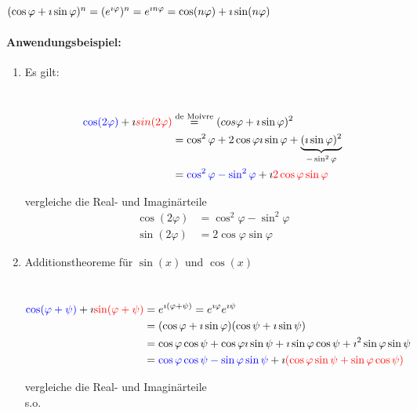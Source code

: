 \Beweis\quad\\
$(\cos\varphi+\imath \sin\varphi)^n = (e^{\imath \varphi})^n = e^{\imath n\varphi} = \cos(n\varphi)+\imath \sin(n\varphi)$

\paragraph{Anwendungsbeispiel:}
\begin{enumerate}
	\item Es gilt:\\
	
	\Beweis \quad\\
	\begin{align*}
	\textcolor{blue}{\cos(2\varphi)}+\imath \textcolor{red}{sin(2\varphi)}&\stackrel{\text{de Moivre}}{=}(cos\varphi+\imath \sin\varphi)^2\\
	&=\cos^2\varphi+2\cos\varphi\imath\sin\varphi+\underbrace{(\imath\sin\varphi)^2}_{-\sin^2\varphi}\\
	&=\textcolor{blue}{\cos^2\varphi-\sin^2\varphi} +\imath \textcolor{red}{2\cos\varphi\sin\varphi}
	\end{align*}
	
	vergleiche die Real- und Imaginärteile\\
	\begin{align*}
	\cos(2\varphi)&=\cos^2\varphi-\sin^2\varphi\\
	\sin(2\varphi)&=2\cos\varphi\sin\varphi
	\end{align*}
	
	\item Additionstheoreme für $\sin(x)$ und $\cos(x)$\\
	\Redbox{$\cos(\varphi + \psi)=\cos\varphi\cos\psi-\sin\varphi\sin\psi\\
		\sin(\varphi + \psi)=\cos\varphi\sin\psi+\sin\varphi\cos\psi$}
	
	\Beweis \quad\\
	\begin{align*}
	\textcolor{blue}{\cos(\varphi + \psi)}+\imath\textcolor{red}{\sin(\varphi + \psi)}&=e^{\imath(\varphi + \psi)} = e^{\imath\varphi}e^{\imath\psi}\\
	&=(\cos\varphi + \imath\sin\varphi)(\cos\psi + \imath\sin\psi)\\
	&=\cos\varphi\cos\psi + \cos\varphi\imath\sin\psi + \imath\sin\varphi\cos\psi + \imath^2\sin\varphi\sin\psi\\
	&=\textcolor{blue}{\cos\varphi\cos\psi - \sin\varphi\sin\psi} + \imath\textcolor{red}{(\cos\varphi\sin\psi + \sin\varphi\cos\psi)}\\
	\end{align*}
	
	vergleiche die Real- und Imaginärteile\\
	\Beh s.o.
\end{enumerate}

